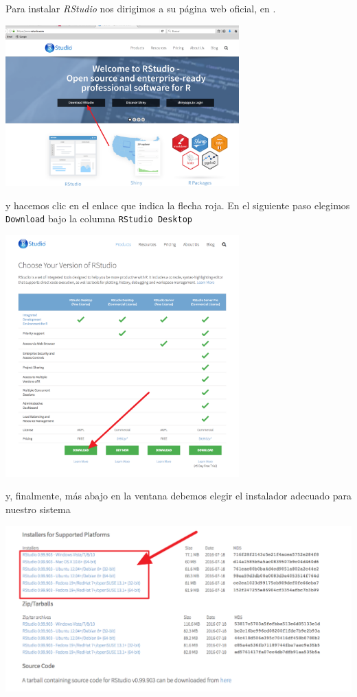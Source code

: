 \documentclass[10pt,a4paper]{article}\usepackage[]{graphicx}\usepackage[]{color}
\begin{document}
Para instalar {\em RStudio} nos dirigimos a su página web oficial, en
.
    \begin{center}
    \includegraphics[width=9cm]{../fig/Tut00-41a.png}
    \end{center}
y hacemos clic en el enlace que indica la flecha roja. En el siguiente paso elegimos {\tt Download} bajo la columna {\tt RStudio Desktop}
    \begin{center}
    \includegraphics[width=9cm]{../fig/Tut00-42a.png}
    \end{center}
y, finalmente, más abajo en la ventana debemos elegir el instalador adecuado para nuestro 
sistema
    \begin{center}
    \includegraphics[width=15cm]{../fig/Tut00-43a.png}
    \end{center}
\end{document}

